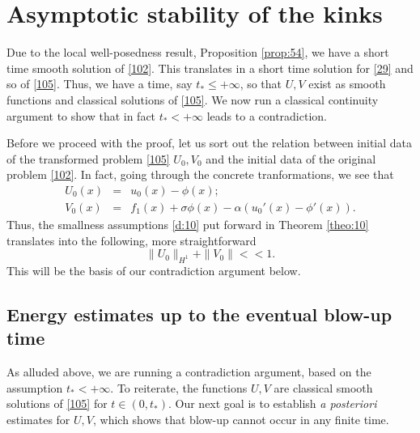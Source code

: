\documentclass[12pt]{amsart}
\theoremstyle{definition}
\theoremstyle{remark}
\numberwithin{equation}{section}
\renewcommand{\(}{\left(}
\renewcommand{\)}{\right)}
\renewcommand{\[}{\left[}
\renewcommand{\]}{\right]}
\newcommand{\al}{\alpha}
\newcommand{\si}{\sigma}
\begin{document}
\section{Asymptotic stability of the kinks}
Due to the local well-posedness result, Proposition \ref{prop:54}, we have a short time smooth solution of \eqref{102}. This translates in a short time  solution for \eqref{29} and so of \eqref{105}. Thus, we have a time, say $t_*\leq +\infty$, so that $U,V$ exist as smooth functions and  classical solutions of \eqref{105}. We now run a classical continuity argument to show that in fact $t_*<+\infty$ leads to a contradiction.  

Before we proceed with the proof, let us sort out the relation between initial data of the transformed problem \eqref{105}  $U_0, V_0$ and the initial data  of the original problem \eqref{102}. In fact, going through the concrete tranformations, we see that 
\begin{eqnarray*}
	U_0 (x) &=& u_0(x)-\phi(x);  \\
	V_0(x) &=& f_1(x) +\si \phi(x) - \al(u_0'(x)-\phi'(x)).
\end{eqnarray*}
Thus, the smallness assumptions \eqref{d:10} put forward in Theorem \ref{theo:10} translates into the following, more straightforward 
\begin{equation}
	\label{d:02} 
	\|U_0\|_{H^1}+\|V_0\|<<1. 
\end{equation}
This will be the basis of our contradiction argument below. 
\subsection{Energy estimates up to the eventual blow-up time}
As alluded above, we are running a contradiction argument, based on the assumption $t_*<+\infty$. To reiterate, the functions $U,V$ are classical smooth solutions of \eqref{105} for $t\in (0, t_*)$. Our next goal is to establish {\it a posteriori} estimates for $U,V$, which shows that blow-up cannot occur in any finite time. 
\end{document}
